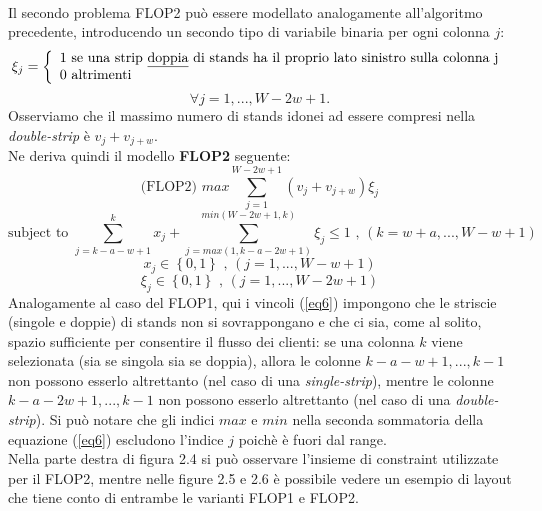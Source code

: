 \documentclass[12pt,a4paper,openright,twoside]{report}
\begin{document}
\\Il secondo problema FLOP2 pu\`{o} essere modellato analogamente all'algoritmo precedente, introducendo un secondo tipo di variabile binaria per ogni colonna $j$:
\begin{equation}\label{eq4}
\xi_{j}=
\left\{
\begin{array}{ll}
1 \mbox{ se una strip \underline{doppia} di stands ha il proprio lato sinistro sulla colonna j} \\
0 \mbox{ altrimenti}
\end{array}
\right.
\end{equation}
$$\forall j = 1,...,W - 2w + 1.$$
Osserviamo che il massimo numero di stands idonei ad essere compresi nella \textit{double-strip} \`{e} $v_{j}+v_{j+w}$. 
\\Ne deriva quindi il modello \textbf{FLOP2} seguente: 
\begin{equation}\label{eq5}
\mbox{(FLOP2) } max \sum_{j=1}^{W-2w+1}(v_{j}+v_{j+w}) \xi_{j} 
\end{equation}
\begin{equation}\label{eq6}
\mbox{subject to } \sum_{j=k-a-w+1}^{k} x_{j} + \sum_{j=max(1, k-a-2w+1)}^{min(W-2w+1, k)} \xi_{j} \leq 1 \mbox{ , } (k = w+a,...,W-w+1) 
\end{equation}
\begin{equation}\label{eq7}
x_{j} \in \left\lbrace 0,1 \right\rbrace \mbox{ , } (j=1,...,W-w+1) 
\end{equation}
\begin{equation}\label{eq8}
\xi_{j} \in \left\lbrace 0,1 \right\rbrace \mbox{ , } (j=1,...,W-2w+1) 
\end{equation}
Analogamente al caso del FLOP1, qui i vincoli (\ref{eq6}) impongono che le striscie (singole e doppie) di stands non si sovrappongano e che ci sia, come al solito, spazio sufficiente per consentire il flusso dei clienti: se una colonna $k$ viene selezionata (sia se singola sia se doppia), allora le colonne $k-a-w+1,...,k-1$ non possono esserlo altrettanto (nel caso di una \textit{single-strip}), mentre le colonne $k-a-2w+1,...,k-1$ non possono esserlo altrettanto (nel caso di una \textit{double-strip}).
Si pu\`{o} notare che gli indici $max$ e $min$ nella seconda sommatoria della equazione (\ref{eq6}) escludono l'indice $j$ poich\`{e} \`{e} fuori dal range.\\ Nella parte destra di figura 2.4 si pu\`{o} osservare l'insieme di constraint utilizzate per il FLOP2, mentre nelle figure 2.5 e 2.6 \`{e} possibile vedere un esempio di layout che tiene conto di entrambe le varianti FLOP1 e FLOP2.
\end{document}
